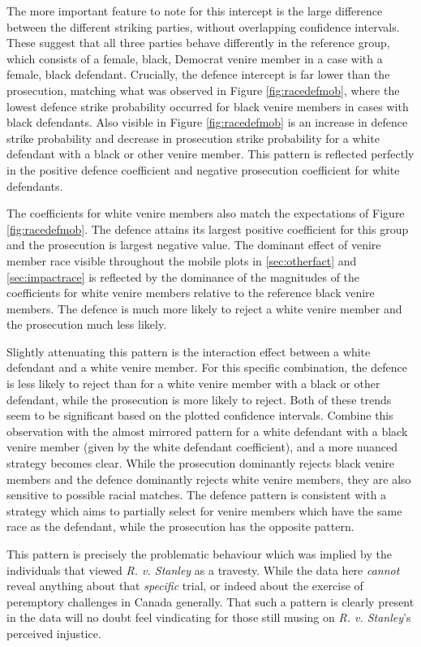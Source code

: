 The more important feature to note for this intercept is the large
difference between the different striking parties, without
overlapping confidence intervals. These suggest that all three parties behave differently in the reference group, which
consists of a female, black, Democrat venire member in a case with a female, black defendant. Crucially, the defence intercept is
far lower than the prosecution, matching what was observed in Figure \ref{fig:racedefmob}, where the lowest defence strike
probability occurred for black venire members in cases with black
defendants. Also visible in Figure \ref{fig:racedefmob} is an increase in
defence strike probability and decrease in prosecution strike probability for a white defendant with a black or other venire
member. This pattern is reflected perfectly in the positive defence coefficient and negative prosecution coefficient for white
defendants.

The coefficients for white venire members also match the expectations of Figure \ref{fig:racedefmob}. The defence attains its
largest positive coefficient for this group and the prosecution is largest negative value. The dominant effect of venire member
race visible throughout the mobile plots in \ref{sec:otherfact} and \ref{sec:impactrace} is reflected by the dominance of the
magnitudes of the coefficients for white venire members relative to the reference black venire members. The defence is much more
likely to reject a white venire member and the prosecution much less likely.

Slightly attenuating this pattern is the interaction effect between a white defendant and a white venire member. For this specific
combination, the defence is less likely to reject than for a white venire member with a black or other defendant, while the
prosecution is more likely to reject. Both of these trends seem to be significant based on the plotted confidence
intervals. Combine this observation with the almost mirrored pattern for a white defendant with a black venire member (given by
the white defendant coefficient), and a more nuanced strategy becomes clear. While the prosecution dominantly rejects black venire
members and the defence dominantly rejects white venire members, they are also sensitive to possible racial matches. The defence
pattern is consistent with a strategy which aims to partially select for venire members which have the same race as the defendant,
while the prosecution has the opposite pattern.

This pattern is precisely the problematic behaviour which was implied by the individuals that viewed \textit{R. v. Stanley} as a
travesty. While the data here \textit{cannot} reveal anything about that \textit{specific} trial, or indeed about the exercise of
peremptory challenges in Canada generally. That such a pattern is clearly present in the data will no doubt feel vindicating for
those still musing on \textit{R. v. Stanley}'s perceived injustice.


